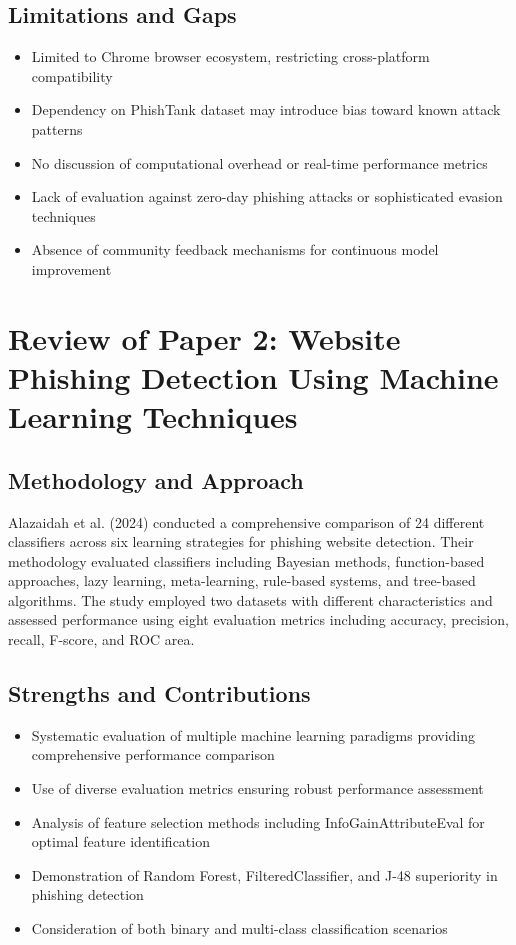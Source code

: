 \subsection*{Limitations and Gaps}
\begin{itemize}
	\item Limited to Chrome browser ecosystem, restricting cross-platform compatibility
	\item Dependency on PhishTank dataset may introduce bias toward known attack patterns
	\item No discussion of computational overhead or real-time performance metrics
	\item Lack of evaluation against zero-day phishing attacks or sophisticated evasion techniques
	\item Absence of community feedback mechanisms for continuous model improvement
\end{itemize}

\section{Review of Paper 2: Website Phishing Detection Using Machine Learning Techniques}

\subsection*{Methodology and Approach}
Alazaidah et al. (2024) conducted a comprehensive comparison of 24 different classifiers across six learning strategies for phishing website detection. Their methodology evaluated classifiers including Bayesian methods, function-based approaches, lazy learning, meta-learning, rule-based systems, and tree-based algorithms. The study employed two datasets with different characteristics and assessed performance using eight evaluation metrics including accuracy, precision, recall, F-score, and ROC area.\cite{arxiv}

\subsection*{Strengths and Contributions}
\begin{itemize}
	\item Systematic evaluation of multiple machine learning paradigms providing comprehensive performance comparison
	\item Use of diverse evaluation metrics ensuring robust performance assessment
	\item Analysis of feature selection methods including InfoGainAttributeEval for optimal feature identification
	\item Demonstration of Random Forest, FilteredClassifier, and J-48 superiority in phishing detection
	\item Consideration of both binary and multi-class classification scenarios
\end{itemize}

